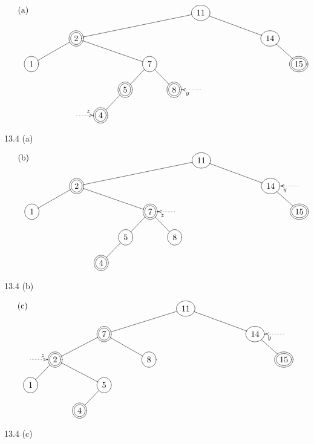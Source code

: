 \documentclass[a4paper]{scrartcl}
\begin{document}
\begin{figure}[htb]
	\centering
	$\begin{xy}
		\entrymodifiers={}
		
		\xymatrixcolsep{1pc}
		\xymatrixrowsep{1pc}
\text{(a)}
		\xymatrix {
& & & & & & & &*++[o][F-]{11}\ar@{-}[rrrrrd]\ar@{-}[llllld]& & & \\
& & &*++[o][F=]{2} \ar@{-}[rrrd]\ar@{-}[llld]& & & & & & & & & &*++[o][F-]{14} \ar@{-}[rd]& \\
*++[o][F-]{1}& & & & & &*++[o][F-]{7} \ar@{-}[rd] \ar@{-}[ld]& & & & & & & & *++[o][F=]{15} \\
& & & & &*++[o][F=]{5}\ar@{-}[ld]& &*++[o][F=]{8}& \ar@{.>}[l]^{y} & & & & & & \\
& & & \ar@{.>}[r]^{z}&*++[o][F=]{4}& & & & & & & & & &\\
		}
	\end{xy}$
		\caption{13.4 (a)}
	\label{Abbildung 13.4 (a)}

\end{figure}
\begin{figure}[htb]
	\centering
	$\begin{xy}
		\entrymodifiers={}
		
		\xymatrixcolsep{1pc}
		\xymatrixrowsep{1pc}
	\text{(b)}
		\xymatrix {
& & & & & & & &*++[o][F-]{11}\ar@{-}[rrrrrd]\ar@{-}[llllld]& & & \\
& & &*++[o][F=]{ 2 } \ar@{-}[rrrd]\ar@{-}[llld]& & & & & & & & & &*++[o][F-]{14} \ar@{-}[rd]&\ar@{.>}[l]^{y}\\
*++[o][F-]{1}& & & & & & *++[o][F=]{7} \ar@{-}[rd] \ar@{-}[ld]& \ar@{.>}[l]^{z} & & & & & & & *++[o][F=]{15} \\
& & & & &*++[o][F-]{5} \ar@{-}[ld]& &*++[o][F-]{8}& & & & \\
& & & &*++[o][F=]{4}& & & & & & &\\
		}
	\end{xy}$
		\caption{13.4 (b)}
	\label{Abbildung 13.4 (b)}

\end{figure}
\begin{figure}[htb]
	\centering
	$\begin{xy}
		\entrymodifiers={}
		
		\xymatrixcolsep{1pc}
		\xymatrixrowsep{1pc}
		\text{(c)}
		\xymatrix {
& & & & & & & &*++[o][F-:red]{11}\ar@{-}[rrrrrd]\ar@{-}[llllld]& & & \\
& & &*++[o][F=]{7} \ar@{-}[rrrd]\ar@{-}[lld]& & & & & & & & & &*++[o][F-]{14} \ar@{-}[rd]&\ar@{.>}[l]^{y} \\
 \ar@{.>}[r]^{z}&*++[o][F=]{2} \ar@{-}[ld]\ar@{-}[rrd]& & & & &*++[o][F-]{8}& & & & & & & & *++[o][F=]{15} \\
*++[o][F-]{1}& & &*++[o][F-]{5}\ar@{-}[ld]& & & & & & & & & & & \\
& &*++[o][F=]{4}\\
		}
	\end{xy}$
		\caption{13.4 (c)}
	\label{Abbildung 13.4 (c)}

\end{figure}
\end{document}
